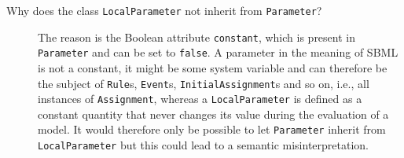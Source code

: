 \documentclass[
  BCOR12mm,
  letterpaper,
  11pt,
  headsepline,
  pointlessnumbers,
  tablecaptionabove,
  onelinecaption,
  headinclude,
  appendixprefix,
  idxtotoc,
  bibtotoc,
  twoside,
  titlepage
]{scrartcl}
\begin{document}
\begin{description}
  \item[Why does the class \texttt{LocalParameter} not inherit from
  \texttt{Parameter}?]
The reason is the Boolean
attribute \texttt{constant}, which is present in
\texttt{Parameter} and can be set to \texttt{false}. A parameter in the meaning
of SBML is not a constant, it might be some system variable
and can therefore be the subject of \texttt{Rule}s,
\texttt{Event}s, \texttt{InitialAssignment}s
and so on, i.e., all instances of \texttt{Assignment},
whereas a \texttt{LocalParameter} is defined as a constant quantity that never
changes its value during the evaluation of a model. It would
therefore only be possible to let \texttt{Parameter} inherit from
\texttt{LocalParameter} but this could lead to a semantic misinterpretation.
\end{description}





\printindex
\end{document}

